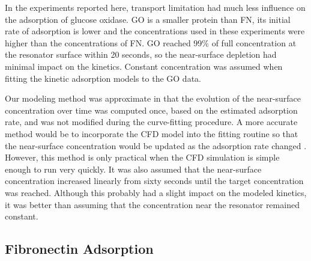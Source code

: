 In the experiments reported here, transport limitation had much less
influence on the adsorption of glucose oxidase. GO is a smaller protein
than FN, its initial rate of adsorption is lower and the concentrations
used in these experiments were higher than the concentrations of FN.
GO reached 99\% of full concentration at the resonator surface within
20 seconds, so the near-surface depletion had minimal impact on the
kinetics. Constant concentration was assumed when fitting the kinetic
adsorption models to the GO data.

Our modeling method was approximate in that the evolution of the near-surface
concentration over time was computed once, based on the estimated
adsorption rate, and was not modified during the curve-fitting procedure.
A more accurate method would be to incorporate the CFD model into
the fitting routine so that the near-surface concentration would be
updated as the adsorption rate changed \cite{Jenkins2004}. However,
this method is only practical when the CFD simulation is simple enough
to run very quickly. It was also assumed that the near-surface concentration
increased linearly from sixty seconds until the target concentration
was reached. Although this probably had a slight impact on the modeled
kinetics, it was better than assuming that the concentration near
the resonator remained constant.


\subsection{Fibronectin Adsorption}

